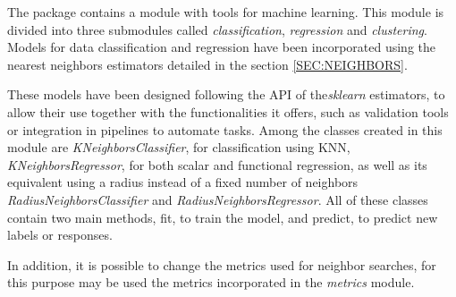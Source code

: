

The package contains a module with tools for machine learning.
This module is divided into three submodules called \textit{classification},
\textit{regression} and \textit{clustering}.
Models for data classification and regression have been incorporated using
the nearest neighbors estimators detailed in the section \ref{SEC:NEIGHBORS}.

These models have been designed following the API of the\textit{sklearn} estimators,
to allow their use together with the functionalities it offers, such as
validation tools or integration in pipelines to automate tasks.
Among the classes created in this module are \textit{KNeighborsClassifier},
for classification using KNN, \textit{KNeighborsRegressor},
for both scalar and functional regression,
as well as its equivalent using a radius instead of a fixed number of neighbors
\textit{RadiusNeighborsClassifier} and \textit{RadiusNeighborsRegressor}.
All of these classes contain two main methods, fit, to train the model,
and predict, to predict new labels or responses.

In addition, it is possible to change the metrics used for neighbor searches,
for this purpose  may be used the metrics incorporated in the \textit{metrics}
module.
